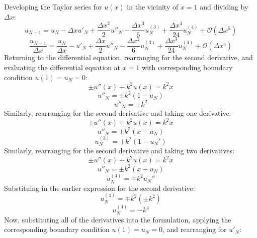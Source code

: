 \documentclass[10pt, reqno]{article}		%
\numberwithin{equation}{section}
\begin{document}
Developing the Taylor series for $u(x)$ in the vicinity of $x = 1$ and dividing by $\Delta x$:
\begin{equation}
u_{N-1} = u_N - \Delta x u'_N + \frac{\Delta x^2}{2} u''_N - \frac{\Delta x^3}{6} u^{(3)}_N + \frac{\Delta x^4}{24} u^{(4)}_N + \mathcal{O}(\Delta x^5)
\end{equation}
\begin{equation}
\frac{u_{N-1}}{\Delta x} = \frac{u_N}{\Delta x} - u'_N + \frac{\Delta x}{2} u''_N - \frac{\Delta x^2}{6} u^{(3)}_N + \frac{\Delta x^3}{24} u^{(4)}_N + \mathcal{O}(\Delta x^4)
\end{equation}
Returning to the differential equation, rearranging for the second derivative, and evaluating the differential equation at $x = 1$ with corresponding boundary condition $u(1) = u_N = 0$:
\begin{equation}
\pm u''(x)+k^2u(x)=k^2x
\end{equation}
\begin{equation}
u''_N = \pm k^2(1-u_N)
\end{equation}
\begin{equation}
u''_N = \pm k^2
\end{equation}
Similarly, rearranging for the second derivative and taking one derivative:
\begin{equation}
\pm u''(x)+k^2u(x)=k^2x
\end{equation}
\begin{equation}
u''_N = \pm k^2(x-u_N)
\end{equation}
\begin{equation}
u^{(3)}_N = \pm k^2(1-u_N')
\end{equation}
Similarly, rearranging for the second derivative and taking two derivatives:
\begin{equation}
\pm u''(x)+k^2u(x)=k^2x
\end{equation}
\begin{equation}
u''_N = \pm k^2(x-u_N)
\end{equation}
\begin{equation}
u^{(4)}_N = \mp k^2u_N''
\end{equation}
Substituing in the earlier expression for the second derivative:
\begin{equation}
u^{(4)}_N = \mp k^2(\pm k^2)
\end{equation}
\begin{equation}
u^{(4)}_N = - k^4
\end{equation}
Now, substituting all of the derivatives into the formulation, applying the corresponding boundary condition $u(1) = u_N = 0$, and rearranging for $u'_N$:
\end{document}
